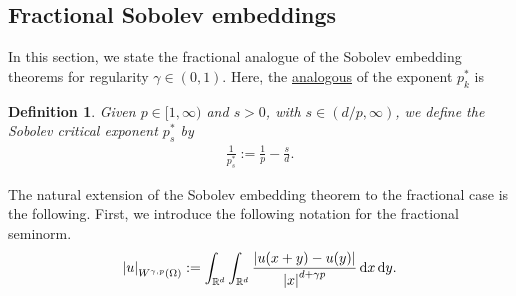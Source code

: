 \documentclass[
    a4paper,
    DIV=14,
    abstract=true,
    numbers=noenddot
]
{scrartcl}
\newtheorem{definition}[theorem]{Definition}
\theoremstyle{definition}
\renewcommand{\d}{\,\mathrm{d}}\newcommand{\dx}{\,\mathrm{d}x}
\newcommand{\R}{\mathbb{R}}
\begin{document}
\subsection{Fractional Sobolev embeddings}
In this section, we state the fractional analogue of the Sobolev embedding theorems for regularity $\gamma \in (0,1)$.
Here, the \href{https://nowheredifferentiable.com/2023-07-12-PDEs-3-Sobolev_spaces/#global:~:text=concludes%20the%20proof.%C2%A0%E2%97%BB-,Exercise,-24%20.%20Given}{analogous} of the exponent $p_k^{*}$ is
\begin{definition}
    Given $p \in [1,\infty)$ and $s>0$, with $s\in (d/p, \infty)$, we define the \emph{Sobolev critical exponent} $p_s^*$ by
    \begin{align*}
        \frac{1}{p_s ^*}:=\frac{1}{p}-\frac{s }{d}.
    \end{align*}
\end{definition}
The natural extension of the Sobolev embedding theorem to the fractional case is the following. First, we introduce the following notation for the fractional seminorm.
\begin{align*}
    \abs{u}_{W^{\gamma, p}(\Omega )}:=\int_{\R^d}\int_{\R^d}\frac{\abs{u(x+y)-u(y)}}{\abs{x}^{d+\gamma p}}\d x \d y.
\end{align*}
\end{document}

